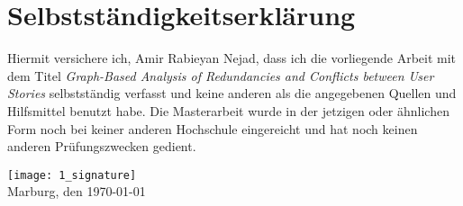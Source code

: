 \section*{Selbstständigkeitserklärung}
Hiermit versichere ich, Amir Rabieyan Nejad, dass ich die vorliegende Arbeit mit dem Titel \emph{Graph-Based Analysis of Redundancies and Conflicts between User Stories} selbstständig verfasst und keine anderen als die angegebenen Quellen und Hilfsmittel benutzt habe. Die Masterarbeit wurde in der jetzigen oder ähnlichen Form noch bei keiner anderen Hochschule eingereicht und hat noch keinen anderen Prüfungszwecken gedient.

\begin{flushleft}
\texttt{[image: 1\_signature]}\\
Marburg, den \today
{}
\end{flushleft}






